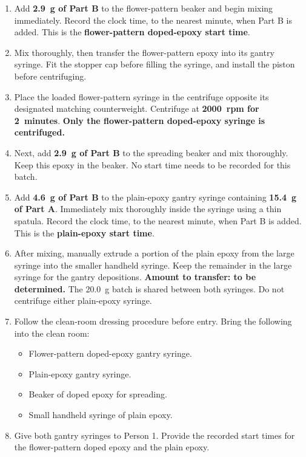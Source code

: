 \documentclass[12pt]{cornelltfpxsop}
\begin{document}
\begin{enumerate}
    \item Add \textbf{2.9~g of Part B} to the flower-pattern beaker and begin mixing immediately. Record the clock time, to the nearest minute, when Part B is added. This is the \textbf{flower-pattern doped-epoxy start time}.

    \item Mix thoroughly, then transfer the flower-pattern epoxy into its gantry syringe. Fit the stopper cap before filling the syringe, and install the piston before centrifuging.

    \item Place the loaded flower-pattern syringe in the centrifuge opposite its designated matching counterweight. Centrifuge at \textbf{2000~rpm for 2~minutes}. \textbf{Only the flower-pattern doped-epoxy syringe is centrifuged.}

    \item Next, add \textbf{2.9~g of Part B} to the spreading beaker and mix thoroughly. Keep this epoxy in the beaker. No start time needs to be recorded for this batch.

    \item Add \textbf{4.6~g of Part B} to the plain-epoxy gantry syringe containing \textbf{15.4~g of Part A}. Immediately mix thoroughly inside the syringe using a thin spatula. Record the clock time, to the nearest minute, when Part B is added. This is the \textbf{plain-epoxy start time}.

    \item After mixing, manually extrude a portion of the plain epoxy from the large syringe into the smaller handheld syringe. Keep the remainder in the large syringe for the gantry depositions. \textbf{Amount to transfer: to be determined.} The 20.0~g batch is shared between both syringes. Do not centrifuge either plain-epoxy syringe.

    \item Follow the clean-room dressing procedure before entry. Bring the following into the clean room:
    \begin{itemize}
        \item Flower-pattern doped-epoxy gantry syringe.
        \item Plain-epoxy gantry syringe.
        \item Beaker of doped epoxy for spreading.
        \item Small handheld syringe of plain epoxy.
    \end{itemize}

    \item Give both gantry syringes to Person 1. Provide the recorded start times for the flower-pattern doped epoxy and the plain epoxy.


\end{enumerate}
\end{document}
